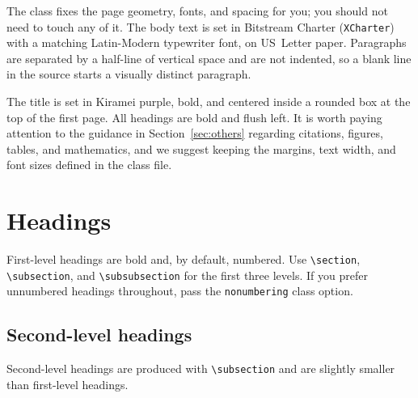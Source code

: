 \documentclass[11pt,letterpaper,twocolumn]{template/style}
\begin{document}
The class fixes the page geometry, fonts, and spacing for you; you should not
need to touch any of it. The body text is set in Bitstream Charter
(\verb+XCharter+) with a matching Latin-Modern typewriter font, on US~Letter
paper. Paragraphs are separated by a half-line of vertical space and are not
indented, so a blank line in the source starts a visually distinct paragraph.

The title is set in Kiramei purple, bold, and centered inside a rounded box at the top
of the first page. All headings are bold and flush left. It is worth paying
attention to the guidance in Section~\ref{sec:others} regarding citations,
figures, tables, and mathematics, and we suggest keeping the margins, text width,
and font sizes defined in the class file.


\section{Headings}
\label{sec:headings}

{\raggedright
First-level headings are bold and, by default, numbered. Use \verb+\section+,
\verb+\subsection+, and \verb+\subsubsection+ for the first three levels. If you
prefer unnumbered headings throughout, pass the \verb+nonumbering+ class option.
\par}

\subsection{Second-level headings}
\label{sec:second}

{\raggedright
Second-level headings are produced with \verb+\subsection+ and are slightly
smaller than first-level headings.
\par}
\end{document}
